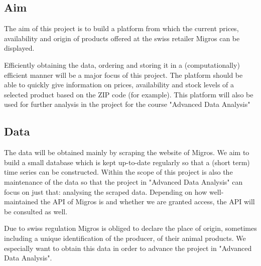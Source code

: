 \documentclass[main]{subfiles}
\begin{document}
\subsection*{Aim}

The aim of this project is to build a platform from which the current prices, availability and origin of products offered at the swiss retailer Migros can be displayed.

Efficiently obtaining the data, ordering and storing it in a (computationally) efficient manner will be a major focus of this project. 
The platform should be able to quickly give information on prices, 
availability and stock levels of a selected product based on the  ZIP code (for example). 
This platform will also be used for further analysis in the project for the course "Advanced Data Analysis"




\subsection*{Data}
The data will be obtained mainly by scraping the website of Migros.
We aim to build a small database which is kept up-to-date regularly so that a (short term) time series can be constructed.
Within the scope of this project is also the maintenance of the data so that the project in "Advanced Data Analysis" can focus on just that: analysing the scraped data. 
Depending on how well-maintained the API of Migros is and whether we are granted access, the API will be consulted as well.

Due to swiss regulation Migros is obliged to declare the place of origin, sometimes including a unique identification of the producer, of their animal products. 
We especially want to obtain this data in order to advance the project in "Advanced Data Analysis".
\end{document}
